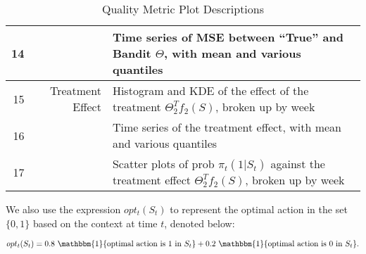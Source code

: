\begin{table}[H]
\begin{tabular}{rr|p{10cm}}
14 & & Time series of MSE between ``True'' and Bandit $\Theta$, with mean and various quantiles \\
\hline
15 & Treatment Effect & Histogram and KDE of the effect of the treatment $\Theta_2^T f_2(S)$, broken up by week \\
16 & & Time series of the treatment effect, with mean and various quantiles \\
17 & & Scatter plots of prob $\pi_t(1 | S_t)$ against the treatment effect $\Theta_2^T f_2(S)$, broken up by week \\
\bottomrule
\end{tabular}
\caption{Quality Metric Plot Descriptions}
\label{QM Table}
\end{table}

We also use the expression $opt_t(S_t)$ to represent the optimal action in the set $\{0,1\}$ based on the context at time $t$, denoted below:

\begin{equation}
\label{opt equation}
	opt_t(S_t) = 0.8\ \mathbbm{1}\{\text{optimal action is $1$ in $S_t$}\} + 0.2\ \mathbbm{1}\{\text{optimal action is $0$ in $S_t$}\} .
\end{equation}
